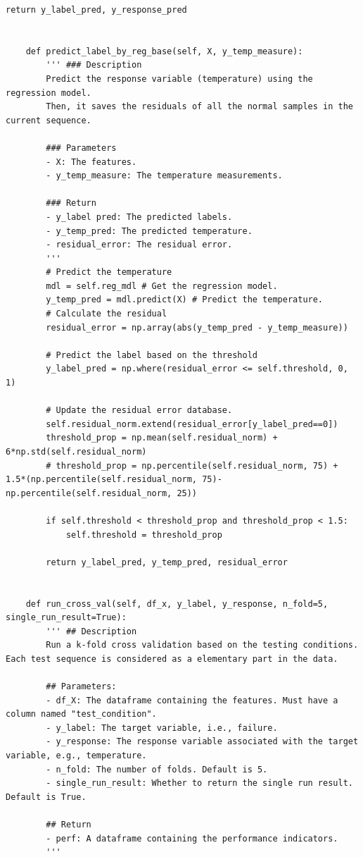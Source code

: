 \documentclass[11pt,a4paper]{article}
\begin{document}
\begin{lstlisting}[style=pyfull]
        return y_label_pred, y_response_pred


    def predict_label_by_reg_base(self, X, y_temp_measure):
        ''' ### Description
        Predict the response variable (temperature) using the regression model.
        Then, it saves the residuals of all the normal samples in the current sequence.

        ### Parameters
        - X: The features.
        - y_temp_measure: The temperature measurements.

        ### Return
        - y_label pred: The predicted labels.
        - y_temp_pred: The predicted temperature.
        - residual_error: The residual error.
        '''
        # Predict the temperature
        mdl = self.reg_mdl # Get the regression model.
        y_temp_pred = mdl.predict(X) # Predict the temperature.
        # Calculate the residual
        residual_error = np.array(abs(y_temp_pred - y_temp_measure))

        # Predict the label based on the threshold
        y_label_pred = np.where(residual_error <= self.threshold, 0, 1)

        # Update the residual error database.
        self.residual_norm.extend(residual_error[y_label_pred==0])
        threshold_prop = np.mean(self.residual_norm) + 6*np.std(self.residual_norm)
        # threshold_prop = np.percentile(self.residual_norm, 75) + 1.5*(np.percentile(self.residual_norm, 75)-np.percentile(self.residual_norm, 25))

        if self.threshold < threshold_prop and threshold_prop < 1.5:
            self.threshold = threshold_prop

        return y_label_pred, y_temp_pred, residual_error


    def run_cross_val(self, df_x, y_label, y_response, n_fold=5, single_run_result=True):
        ''' ## Description
        Run a k-fold cross validation based on the testing conditions. Each test sequence is considered as a elementary part in the data.

        ## Parameters:
        - df_X: The dataframe containing the features. Must have a column named "test_condition".
        - y_label: The target variable, i.e., failure.
        - y_response: The response variable associated with the target variable, e.g., temperature.
        - n_fold: The number of folds. Default is 5.
        - single_run_result: Whether to return the single run result. Default is True.

        ## Return
        - perf: A dataframe containing the performance indicators.
        '''


\end{lstlisting}
\end{document}
